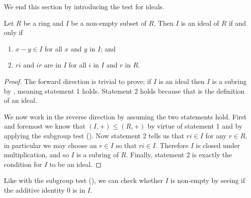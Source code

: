 \newpage

We end this section by introducing the test for ideals.
\begin{theorem}\label{thrm-test-for-ideal}
    Let $R$ be a ring and $I$ be a non-empty subset of $R$. Then $I$ is an ideal of $R$ if and only if
    \begin{enumerate}[label=(\arabic*)]
        \item $x - y \in I$ for all $x$ and $y$ in $I$; and
        \item $ri$ and $ir$ are in $I$ for all $i$ in $I$ and $r$ in $R$.
    \end{enumerate}
\end{theorem}
\begin{proof}
    The forward direction is trivial to prove; if $I$ is an ideal then $I$ is a subring by , meaning statement 1 holds. Statement 2 holds because that is the definition of an ideal.

    We now work in the reverse direction by assuming the two statements hold. First and foremost we know that $(I,+) \leq (R,+)$ by virtue of statement 1 and by applying the subgroup test (). Now statement 2 tells us that $ri \in I$ for any $r \in R$, in particular we may choose an $r \in I$ so that $ri \in I$. Therefore $I$ is closed under multiplication, and so $I$ is a subring of $R$. Finally, statement 2 is exactly the condition for $I$ to be an ideal.
\end{proof}
\begin{remark}
    Like with the subgroup test (), we can check whether $I$ is non-empty by seeing if the additive identity 0 is in $I$.
\end{remark}

\newpage

